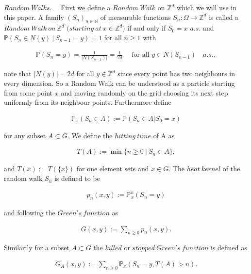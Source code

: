 \documentclass[12pt,a4paper]{scrartcl}
\numberwithin{equation}{section}
\numberwithin{equation}{section}
\theoremstyle{definition}
\begin{document}
\noindent $\boldsymbol{\mathit{Random\ Walks}}.\quad$ First we define a $\mathit{Random\ Walk}$ on $\mathbb{Z}^d$ which we will use in this paper. A family $(S_n)_{n\in \mathbb{N}}$ of measurable functions $S_n: \Omega \to \mathbb{Z}^d$ is called a $\mathit{Random\ Walk\ on}\ \mathbb{Z}^d$ $\mathit{(starting\ at}\ x\in \mathbb{Z}^d)$ if and only if $S_0=x$ $a.s.$ and $\mathbb{P}(S_n\in N(y)\ |\ S_{n-1} = y) = 1$ for all $n \geq 1$ with 

\begin{align*}
	\mathbb{P}(S_n = y) = \frac{1}{|N(S_{n-1})|} = \frac{1}{2d}\quad \text{ for all }  y\in N(S_{n-1})\quad a.s., 
\end{align*}

note that $|N(y)| = 2d$ for all $y\in \mathbb{Z}^d$ since every point has two neighbours in every dimension. So a Random Walk can be understood as a particle starting from some point $x$ and moving randomly on the grid choosing its next step uniformly from its neighbour points. Furthermore define 

\begin{align*}
	\mathbb{P}_x(S_n\in A) := \mathbb{P}(S_n\in A|S_0=x)
\end{align*}

for any subset $A\subset G$. We define the $hitting\ time$ of A as 

\begin{align*}
	T(A) := \min \{n\geq 0\ |\ S_n\in A\},
\end{align*}

and $T(x):= T(\{x\})$ for one element sets and $x\in G$. The $heat\ kernel$ of the random walk $S_n$ is defined to be 

\begin{align*}
	p_n(x,y):=\mathbb{P}^n_x(S_n=y)
\end{align*}

and following the $\mathit{Green's\ function}$ as 

\begin{align*}
	G(x,y) := \sum_{n\geq 0} p_n(x,y).
\end{align*}

Similarily for a subset $A\subset G$ the $killed$ or $\mathit{stopped\ Green's\ function}$ is defined as

\begin{align*}
	G_A(x,y) := \sum_{n\geq 0} \mathbb{P}_x(S_n=y, T(A) > n).
\end{align*} 


\newpage
\end{document}
